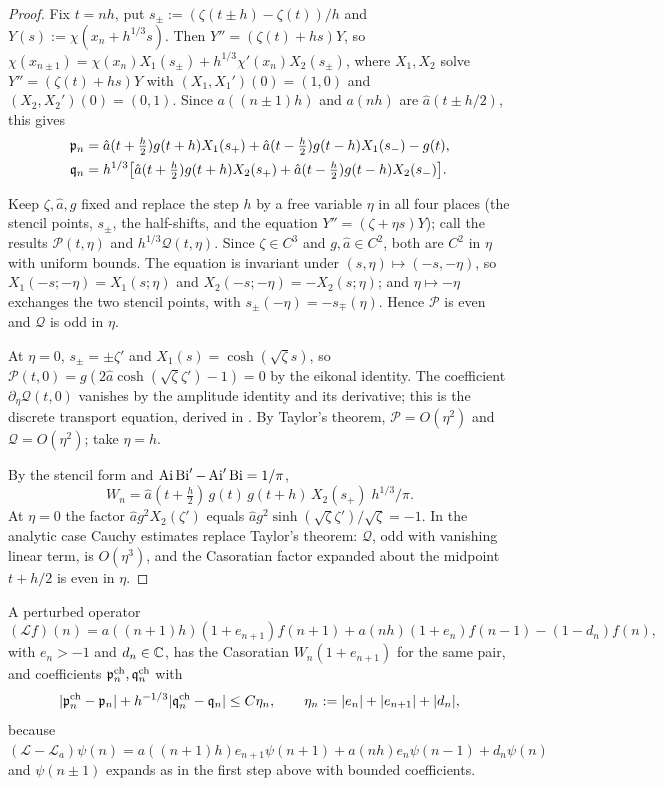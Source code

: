 \begin{proof}
 Fix $t=nh$, put $s_\pm:=(\zeta(t\pm h)-\zeta(t))/h$ and
$Y(s):=\chi(x_n+h^{1/3}s)$. Then $Y''=(\zeta(t)+hs)Y$, so
$\chi(x_{n\pm1})=\chi(x_n)X_1(s_\pm)+h^{1/3}\chi'(x_n)X_2(s_\pm)$, where $X_1,X_2$ solve
$Y''=(\zeta(t)+hs)Y$ with $(X_1,X_1')(0)=(1,0)$ and $(X_2,X_2')(0)=(0,1)$. Since
$a((n\pm1)h)$ and $a(nh)$ are $\hat a(t\pm h/2)$, this gives
\[
  \begin{aligned}
  \mathfrak{p}_n&=\hat a(t+\tfrac h2)g(t+h)X_1(s_+)+\hat a(t-\tfrac h2)g(t-h)X_1(s_-)-g(t),\\
  \mathfrak{q}_n&=h^{1/3}\bigl[\hat a(t+\tfrac h2)g(t+h)X_2(s_+)+\hat a(t-\tfrac h2)g(t-h)X_2(s_-)\bigr].
  \end{aligned}
\]

 Keep $\zeta,\hat a,g$ fixed and replace the step $h$ by a free
variable $\eta$ in all four places (the stencil points, $s_\pm$, the half-shifts, and the
equation $Y''=(\zeta+\eta s)Y$); call the results $\mathcal P(t,\eta)$ and $h^{1/3}\mathcal Q(t,\eta)$. Since
$\zeta\in C^3$ and $g,\hat a\in C^2$, both are $C^2$ in $\eta$ with uniform bounds. The
equation is invariant under $(s,\eta)\mapsto(-s,-\eta)$, so $X_1(-s;-\eta)=X_1(s;\eta)$ and
$X_2(-s;-\eta)=-X_2(s;\eta)$; and $\eta\mapsto-\eta$ exchanges the two stencil points, with
$s_\pm(-\eta)=-s_\mp(\eta)$. Hence $\mathcal P$ is even and $\mathcal Q$ is odd in $\eta$.

 At $\eta=0$, $s_\pm=\pm\zeta'$ and $X_1(s)=\cosh(\sqrt\zeta s)$, so
$\mathcal P(t,0)=g(2\hat a\cosh(\sqrt\zeta\zeta')-1)=0$ by the eikonal identity. The coefficient
$\partial_\eta\mathcal Q(t,0)$ vanishes by the amplitude identity and its derivative; this is the
discrete transport equation, derived in . By Taylor's theorem,
$\mathcal P=O(\eta^2)$ and $\mathcal Q=O(\eta^2)$; take $\eta=h$.

 By the stencil form and $\operatorname{Ai}\operatorname{Bi}'-\operatorname{Ai}'\operatorname{Bi}=1/\pi$,
\[
  W_n=\hat a(t+\tfrac h2)\,g(t)\,g(t+h)\,X_2(s_+)\;h^{1/3}/\pi .
\]
At $\eta=0$ the factor $\hat ag^2X_2(\zeta')$ equals
$\hat ag^2\sinh(\sqrt\zeta\zeta')/\sqrt\zeta=-1$. In the analytic case Cauchy estimates
replace Taylor's theorem: $\mathcal Q$, odd with vanishing linear term, is $O(\eta^3)$, and the
Casoratian factor expanded about the midpoint $t+h/2$ is even in $\eta$.
\end{proof}

A perturbed operator
\begin{equation}\label{eq:Lpert}
  (\mathcal Lf)(n)=a((n+1)h)(1+e_{n+1})f(n+1)+a(nh)(1+e_n)f(n-1)-(1-d_n)f(n),
\end{equation}
with $e_n>-1$ and $d_n\in\mathbb{C}$, has the Casoratian $W_n(1+e_{n+1})$ for the same pair, and
coefficients $\mathfrak{p}^{\rm ch}_n,\mathfrak{q}^{\rm ch}_n$ with
\begin{equation}\label{eq:Wlemma}
  |\mathfrak{p}^{\rm ch}_n-\mathfrak{p}_n|+h^{-1/3}|\mathfrak{q}^{\rm ch}_n-\mathfrak{q}_n|\le C\eta_n,\qquad
  \eta_n:=|e_n|+|e_{n+1}|+|d_n|,
\end{equation}
because $(\mathcal L-\mathcal L_a)\psi(n)=a((n+1)h)e_{n+1}\psi(n+1)+a(nh)e_n\psi(n-1)+d_n\psi(n)$ and
$\psi(n\pm1)$ expands as in the first step above with bounded coefficients.

